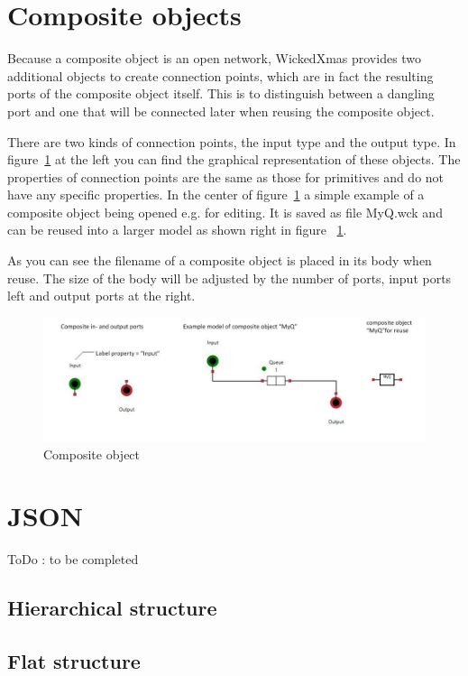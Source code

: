 \documentclass[a4paper,11pt,final]{article}
\begin{document}
\section{Composite objects}
Because a composite object is an open network, WickedXmas provides two
additional objects to create connection points, which are in fact the resulting
ports of the composite object itself. This is to distinguish between a
dangling port and one that will be connected later when reusing the
composite object.

There are two kinds of connection points, the input type and the output type.
In figure~\ref{fig:CompObj} at the left you can find the graphical
representation of these objects. The properties of connection points are
the same as those for primitives and do not have any specific properties.
In the center of figure~\ref{fig:CompObj} a simple example of a
composite object being opened e.g. for editing. It is saved as file MyQ.wck
and can be reused into a larger model as shown right in figure ~\ref{fig:CompObj}.

As you can see the filename of a composite object is placed in its
body when reuse. The size of the body will be adjusted by the number
of ports, input ports left and output ports at the right.


\begin{figure}[here]
\includegraphics[width=1.0\textwidth]{CompObj}
\caption{Composite object}
\label{fig:CompObj}
\end{figure}


\newpage
\section{JSON}
ToDo : to be completed
\subsection{Hierarchical structure}
\subsection{Flat structure}
\end{document}
